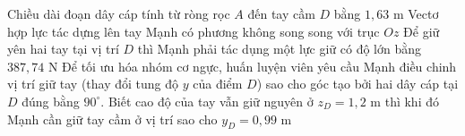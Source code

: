 \begin{ex}
	{\True Chiều dài đoạn dây cáp tính từ ròng rọc $A$ đến tay cầm $D$ bằng $1{,}63$ m}
	{\True Vectơ hợp lực tác dựng lên tay Mạnh có phương không song song với trục $Oz$}
	{\True Để giữ yên hai tay tại vị trí $D$ thì Mạnh phải tác dụng một lực giữ có độ lớn bằng $387{,}74$ N}
	{Để tối ưu hóa nhóm cơ ngực, huấn luyện viên yêu cầu Mạnh điều chinh vị trí giữ tay (thay đổi tung độ $y$ của điểm $D$) sao cho góc tạo bởi hai dây cáp tại $D$ đúng bằng $90^{\circ}$. Biết cao độ của tay vẫn giữ nguyên ở $z_{D}=1{,}2$ m thì khi đó Mạnh cần giữ tay cầm ở vị trí sao cho $y_{D}=0{,}99$ m}
	 \end{ex}

